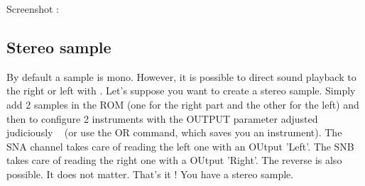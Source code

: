 Screenshot :

\subsection{Stereo sample}

By default a sample is mono. However, it is possible to direct sound playback to the right or left with \FAT.
Let's suppose you want to create a stereo sample.
Simply add 2 samples in the ROM (one for the right part and the other for the left) and then to configure 2 instruments
with the OUTPUT parameter adjusted judiciously
  (or use the OR command, which saves you an instrument).
The SNA channel takes care of reading the left one with an OUtput 'Left'.
The SNB takes care of reading the right one with a OUtput 'Right'. The reverse is also possible. It does not matter.
That's it ! You have a stereo sample.
